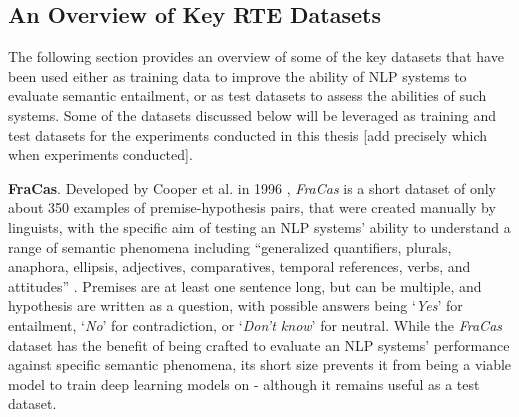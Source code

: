 \documentclass[12pt,twoside]{report}
\begin{document}
\subsection{An Overview of Key RTE Datasets} 

The following section provides an overview of some of the key datasets that have been used either as training data to improve the ability of NLP systems to evaluate semantic entailment, or as test datasets to assess the abilities of such systems. Some of the datasets discussed below will be leveraged as training and test datasets for the experiments conducted in this thesis [add precisely which when experiments conducted]. \newline \par

\textbf{FraCas}. Developed by Cooper et al. in 1996 \cite{CooperFracas},   \textit{FraCas} is a short dataset of only about 350 examples of premise-hypothesis pairs, that were created manually by linguists, with the specific aim of testing an NLP systems' ability to understand a range of semantic phenomena including ``generalized quantifiers, plurals, anaphora, ellipsis, adjectives, comparatives, temporal references, verbs, and attitudes'' \cite{poliak-2020-survey}. Premises are at least one sentence long, but can be multiple, and hypothesis are written as a question, with possible answers being `\textit{Yes}' for entailment, `\textit{No}' for contradiction, or `\textit{Don't know}' for neutral. While the \textit{FraCas} dataset has the benefit of being crafted to evaluate an NLP systems' performance against specific semantic phenomena, its short size prevents it from being a viable model to train deep learning models on - although it remains useful as a test dataset. \newline \par
\end{document}
